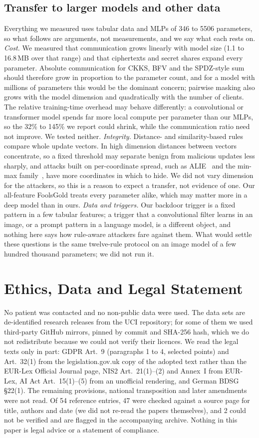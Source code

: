 \documentclass[conference]{IEEEtran}
\begin{document}
\subsection{Transfer to larger models and other data}
Everything we measured uses tabular data and MLPs of 346 to 5506 parameters, so what follows are arguments, not measurements, and we say what each rests on. \emph{Cost.} We measured that communication grows linearly with model size (1.1 to 16.8\,MB over that range) and that ciphertexts and secret shares expand every parameter. Absolute communication for CKKS, BFV and the SPDZ-style sum should therefore grow in proportion to the parameter count, and for a model with millions of parameters this would be the dominant concern; pairwise masking also grows with the model dimension and quadratically with the number of clients. The relative training-time overhead may behave differently: a convolutional or transformer model spends far more local compute per parameter than our MLPs, so the 32\% to 145\% we report could shrink, while the communication ratio need not improve. We tested neither. \emph{Integrity.} Distance- and similarity-based rules compare whole update vectors. In high dimension distances between vectors concentrate, so a fixed threshold may separate benign from malicious updates less sharply, and attacks built on per-coordinate spread, such as ALIE~\cite{baruch2019} and the min-max family~\cite{shejwalkar2021}, have more coordinates in which to hide. We did not vary dimension for the attackers, so this is a reason to expect a transfer, not evidence of one. Our all-feature FoolsGold treats every parameter alike, which may matter more in a deep model than in ours. \emph{Data and triggers.} Our backdoor trigger is a fixed pattern in a few tabular features; a trigger that a convolutional filter learns in an image, or a prompt pattern in a language model, is a different object, and nothing here says how rule-aware attackers fare against them. What would settle these questions is the same twelve-rule protocol on an image model of a few hundred thousand parameters; we did not run it.

\section{Ethics, Data and Legal Statement}\label{sec:ethics}
No patient was contacted and no non-public data were used. The data sets are de-identified research releases from the UCI repository; for some of them we used third-party GitHub mirrors, pinned by commit and SHA-256 hash, which we do not redistribute because we could not verify their licences. We read the legal texts only in part: GDPR Art.~9 (paragraphs 1 to 4, selected points) and Art.~32(1) from the legislation.gov.uk copy of the adopted text rather than the EUR-Lex Official Journal page, NIS2 Art.~21(1)--(2) and Annex~I from EUR-Lex, AI Act Art.~15(1)--(5) from an unofficial rendering, and German BDSG \S22(1). The remaining provisions, national transposition and later amendments were not read. Of 54 reference entries, 47 were checked against a source page for title, authors and date (we did not re-read the papers themselves), and 2 could not be verified and are flagged in the accompanying archive. Nothing in this paper is legal advice or a statement of compliance.
\end{document}
